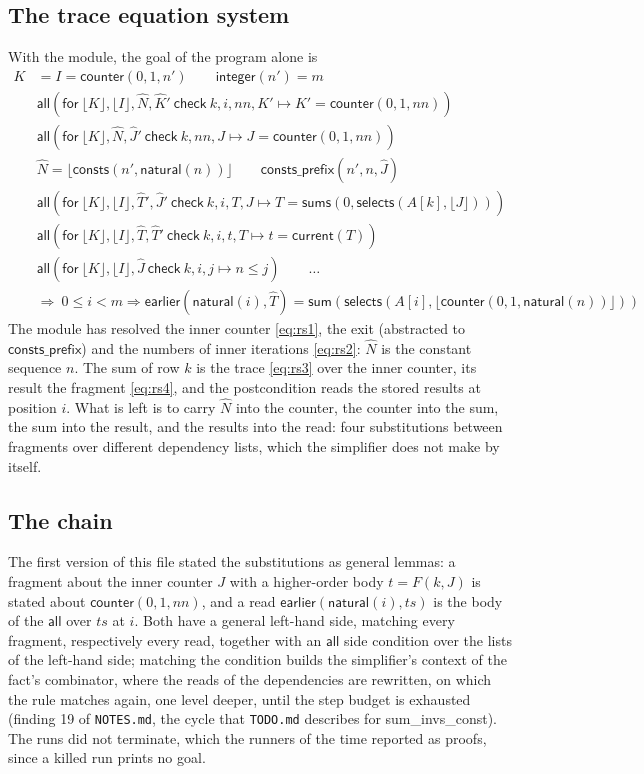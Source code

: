 \documentclass[11pt,a4paper]{article}
\newcommand{\bl}[1]{\lfloor #1\rfloor}                       %
\newcommand{\al}[2]{\mathsf{all}(\mathsf{for}\ #1\ \mathsf{check}\ #2)}
\newcommand{\cnt}{\mathsf{counter}}
\newcommand{\cur}{\mathsf{current}}
\newcommand{\intf}{\mathsf{integer}}
\newcommand{\natf}{\mathsf{natural}}
\newcommand{\sums}{\mathsf{sums}}
\newcommand{\lemma}[1]{\textsf{#1}}
\newcommand{\seq}[1]{\hat{#1}}                               %
\begin{document}
\subsection{The trace equation system}
With the module, the goal of the program alone is
\begin{align}
  K &= I = \cnt(0, 1, n') \qquad \intf(n') = m \label{eq:rs0}\\
  &\al{\bl{K}, \bl{I}, \seq{N}, \seq{K}'}{k, i, nn, K' \mapsto K' = \cnt(0, 1, nn)} \nonumber\\
  &\al{\bl{K}, \seq{N}, \seq{J}'}{k, nn, J \mapsto J = \cnt(0, 1, nn)} \label{eq:rs1}\\
  &\seq{N} = \bl{\mathsf{consts}(n', \natf(n))} \qquad \mathsf{consts\_prefix}(n', n, \seq{J}) \label{eq:rs2}\\
  &\al{\bl{K}, \bl{I}, \seq{T}', \seq{J}'}{k, i, T, J \mapsto T = \sums(0, \mathsf{selects}(A[k], \bl{J}))} \label{eq:rs3}\\
  &\al{\bl{K}, \bl{I}, \seq{T}, \seq{T}'}{k, i, t, T \mapsto t = \cur(T)} \label{eq:rs4}\\
  &\al{\bl{K}, \bl{I}, \seq{J}}{k, i, j \mapsto n \le j} \qquad \ldots \nonumber\\
  &\Longrightarrow\ 0 \le i < m \Rightarrow \mathsf{earlier}(\natf(i), \seq{T}) = \mathsf{sum}(\mathsf{selects}(A[i], \bl{\cnt(0, 1, \natf(n))})) \nonumber
\end{align}
The module has resolved the inner counter \eqref{eq:rs1}, the exit (abstracted to $\mathsf{consts\_prefix}$)
and the numbers of inner iterations \eqref{eq:rs2}: $\seq{N}$ is the constant sequence $n$. The sum of
row $k$ is the trace \eqref{eq:rs3} over the inner counter, its result the fragment \eqref{eq:rs4}, and the
postcondition reads the stored results at position $i$. What is left is to carry $\seq{N}$ into the counter,
the counter into the sum, the sum into the result, and the results into the read: four substitutions
between fragments over different dependency lists, which the simplifier does not make by itself.

\subsection{The chain}
The first version of this file stated the substitutions as general lemmas: a fragment about the inner
counter $J$ with a higher-order body $t = F(k, J)$ is stated about $\cnt(0, 1, nn)$, and a read
$\mathsf{earlier}(\natf(i), ts)$ is the body of the $\mathsf{all}$ over $ts$ at $i$. Both have a general
left-hand side, matching every fragment, respectively every read, together with an $\mathsf{all}$ side
condition over the lists of the left-hand side; matching the condition builds the simplifier's context of
the fact's combinator, where the reads of the dependencies are rewritten, on which the rule matches again,
one level deeper, until the step budget is exhausted (finding 19 of \texttt{NOTES.md}, the cycle that
\texttt{TODO.md} describes for \lemma{sum\_invs\_const}). The runs did not terminate, which the runners of
the time reported as proofs, since a killed run prints no goal.
\end{document}
